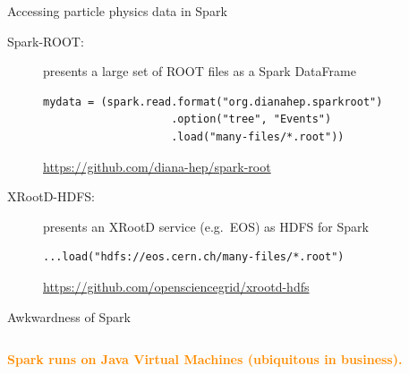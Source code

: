 \documentclass[aspectratio=169]{beamer}
\begin{document}
\begin{frame}[fragile]{Accessing particle physics data in Spark}
\large
\vspace{0.5 cm}
\begin{description}
\item[Spark-ROOT:] presents a large set of ROOT files as a Spark DataFrame

\small
\begin{verbatim}
mydata = (spark.read.format("org.dianahep.sparkroot")
                    .option("tree", "Events")
                    .load("many-files/*.root"))
\end{verbatim}

\normalsize
\textcolor{blue}{\url{https://github.com/diana-hep/spark-root}}
\large

\vspace{0.5 cm}
\item[XRootD-HDFS:] presents an XRootD service (e.g.\ EOS) as HDFS for Spark

\small
\begin{verbatim}
...load("hdfs://eos.cern.ch/many-files/*.root")
\end{verbatim}

\normalsize
\textcolor{blue}{\url{https://github.com/opensciencegrid/xrootd-hdfs}}
\end{description}

\vspace{0.5 cm}
\end{frame}

\begin{frame}{Awkwardness of Spark}
\Large
\vspace{0.5 cm}
\begin{columns}
\begin{center}
\textcolor{darkorange}{\bf Spark runs on Java Virtual Machines (ubiquitous in business).}

\vspace{1 cm}

\vspace{1 cm}
\end{center}
\end{columns}
\end{frame}
\end{document}
